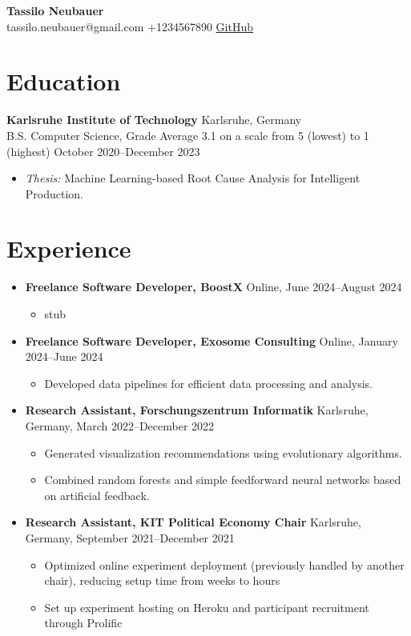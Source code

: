 \documentclass[letterpaper,10pt]{article}
\newcommand{\header}[4]{
    \begin{center}
        \textbf{\Huge{#1}}\\
        \small{
            #2 \hspace{1em}
            \textcolor{accent}{#3} \hspace{1em}
            \href{#4}{GitHub}
        }
    \end{center}
}
\begin{document}
\header{Tassilo Neubauer}{tassilo.neubauer@gmail.com}{+1234567890}{https://github.com/sonofhypnos}

\section*{Education}
\textbf{Karlsruhe Institute of Technology} \hfill Karlsruhe, Germany \\
B.S. Computer Science, Grade Average 3.1 on a scale from 5 (lowest) to 1 (highest) \hfill October 2020--December 2023
\begin{itemize}
    \item \textit{Thesis:} Machine Learning-based Root Cause Analysis for Intelligent Production.
\end{itemize}



\section*{Experience}
\begin{itemize}
    \item \textbf{Freelance Software Developer, BoostX} \hfill Online, June 2024--August 2024
    \begin{itemize}
            \item stub
    \end{itemize}
    \item \textbf{Freelance Software Developer, Exosome Consulting} \hfill Online, January 2024--June 2024
    \begin{itemize}
        \item Developed data pipelines for efficient data processing and analysis.
    \end{itemize}
    \item \textbf{Research Assistant, Forschungszentrum Informatik} \hfill Karlsruhe, Germany, March 2022--December 2022
    \begin{itemize}
        \item Generated visualization recommendations using evolutionary algorithms.
        \item Combined random forests and simple feedforward neural networks based on artificial feedback.
    \end{itemize}
    \item \textbf{Research Assistant, KIT Political Economy Chair} \hfill Karlsruhe, Germany, September 2021--December 2021
    \begin{itemize}
        \item Optimized online experiment deployment (previously handled by another chair), reducing setup time from weeks to hours
        \item Set up experiment hosting on Heroku and participant recruitment through Prolific
    \end{itemize}
\end{itemize}
\end{document}
